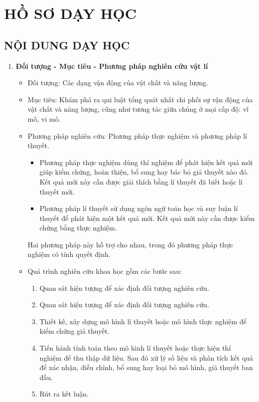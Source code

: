 \section{HỒ SƠ DẠY HỌC}
\subsection{NỘI DUNG DẠY HỌC}
\begin{enumerate}[label=\bfseries\arabic*.]
	\item \textbf{Đối tượng - Mục tiêu - Phương pháp nghiên cứu vật lí}
	\begin{itemize}
		\item Đối tượng: Các dạng vận động của vật chất và năng lượng.
		\item Mục tiêu: Khám phá ra qui luật tổng quát nhất chi phối sự vận động của vật chất và năng lượng, cũng như tương tác giữa chúng ở mọi cấp độ: vĩ mô, vi mô.
		\item Phương pháp nghiên cứu: Phương pháp thực nghiệm và phương pháp lí thuyết.
		\begin{itemize}
			\item Phương pháp thực nghiệm dùng thí nghiệm để phát hiện kết quả mới giúp kiểm chứng, hoàn thiện, bổ sung hay bác bỏ giả thuyết nào đó. Kết quả mới này cần được giải thích bằng lí thuyết đã biết hoặc lí thuyết mới.
			\item Phương pháp lí thuyết sử dụng ngôn ngữ toán học và suy luận lí thuyết để phát hiện một kết quả mới. Kết quả mới này cần được kiểm chứng bằng thực nghiệm.
		\end{itemize}
	Hai phương pháp này hỗ trợ cho nhau, trong đó phương
	pháp thực nghiệm có tính quyết định.
	\item Quá trình nghiên cứu khoa học gồm các bước sau:
	\begin{enumerate}[label=\bfseries Bước \arabic*.]
		\item Quan sát hiện tượng để xác định đối tượng nghiên cứu.
		\item Quan sát hiện tượng để xác định đối tượng nghiên cứu.
		\item Thiết kế, xây dựng mô hình lí thuyết hoặc mô hình thực nghiệm để kiểm chứng giả thuyết.
		\item Tiến hành tính toán theo mô hình lí thuyết hoặc thực hiện thí nghiệm để thu thập dữ liệu. Sau đó xử lý số liệu và phân tích kết quả để xác nhận, điều chỉnh, bổ sung hay loại bỏ mô hình, giả
		thuyết ban đầu.
		\item Rút ra kết luận.
	\end{enumerate}

\end{itemize}
\end{enumerate}
